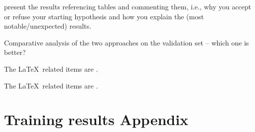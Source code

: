 \documentclass[11pt]{article}
\begin{document}
present the results referencing tables and commenting them, i.e., why you
accept or refuse your starting hypothesis and how you explain the (most
notable/unexpected) results.

Comparative analysis of the two approaches on the validation set – which one is
better?

The \LaTeX\ related items are
\cite{frohmann2024segmenttextuniversalapproach}. 

The \LaTeX\ related items are
\cite{redaelli-sprugnoli-2024-sentence}. 

\appendix
\section{Training results Appendix}
\label{sec:appendix1}


\end{document}
